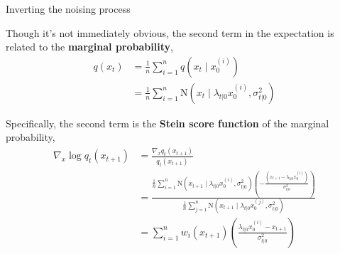 \documentclass[aspectratio=169]{beamer}
\begin{document}
\begin{frame}[t,allowframebreaks]{Inverting the noising
process}

Though it's not immediately obvious, the second term in the expectation
is related to the \textbf{marginal probability}, 
\begin{align*}
q(x_t) 
&= \frac{1}{n} \sum_{i=1}^n q(x_t \mid x_0^{(i)}) \\
&= \frac{1}{n} \sum_{i=1}^n \mathrm{N}(x_t \mid \lambda_{t|0} x_0^{(i)}, \sigma_{t|0}^2) 
\end{align*} 

Specifically, the second term is the \textbf{Stein score
function} of the marginal probability, 
\begin{align*}
\nabla_{x} \log q_t(x_{t+1})
&= \frac{\nabla_{x} q_t(x_{t+1})}{q_t(x_{t+1})}  \\
&=\frac{\frac{1}{n} \sum_{i=1}^n \mathrm{N}(x_{t+1} \mid \lambda_{t|0} x_0^{(i)}, \sigma_{t|0}^2) \left(-\frac{(x_{t+1} - \lambda_{t|0}x_0^{(i)})}{\sigma_{t|0}^2} \right)}{\frac{1}{n} \sum_{j=1}^n \mathrm{N}(x_{t+1} \mid \lambda_{t|0} x_0^{(j)}, \sigma_{t|0}^2) } \\
&= \sum_{i=1}^n w_i(x_{t+1}) \left(\frac{\lambda_{t|0}x_0^{(i)} - x_{t+1}}{\sigma_{t|0}^2} \right)
\end{align*}
\end{frame}
\end{document}
